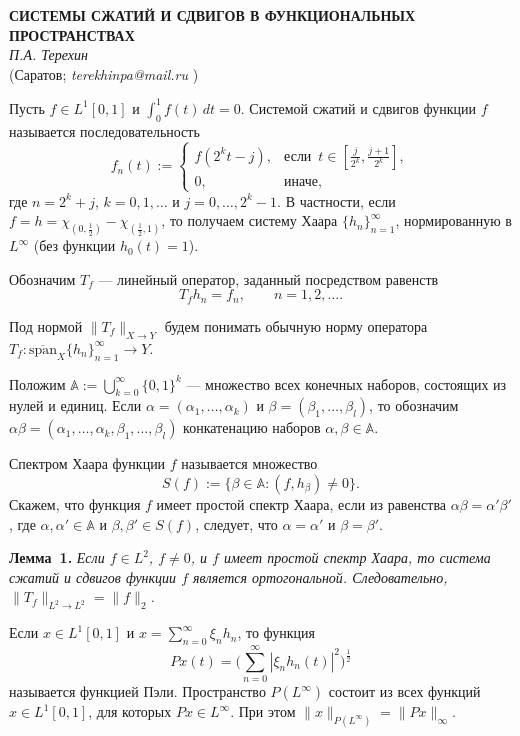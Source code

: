 \begin{center}{ \bf  СИСТЕМЫ СЖАТИЙ И СДВИГОВ В ФУНКЦИОНАЛЬНЫХ ПРОСТРАНСТВАХ}\\
{\it П.А. Терехин } \\
(Саратов; {\it terekhinpa@mail.ru} )
\end{center}

Пусть $f\in L^1[0,1]$ и $\int_0^1f(t)\,dt=0$. Системой сжатий и сдвигов функции $f$ называется последовательность
$$
f_n(t):=\begin{cases}
f(2^kt-j), & \text{если}\,\,\, t\in[\frac{j}{2^k},\frac{j+1}{2^k}], \\
0, & \text{иначе},
\end{cases}
$$
где $n=2^k+j$, $k=0,1,\ldots$ и $j=0,\ldots,2^k-1$. В частности, если $f=h=\chi_{(0,\frac12)}-\chi_{(\frac12,1)}$, то получаем
систему Хаара $\{h_n\}_{n=1}^{\infty}$, нормированную в $L^{\infty}$ (без функции $h_0(t)=1$).

Обозначим $T_f$ --- линейный оператор, заданный посредством равенств
$$
T_fh_n=f_n, \qquad n=1,2,\ldots.
$$

Под нормой $\|T_f\|_{X\to Y}$ будем понимать обычную норму оператора $T_f:\overline{\text{span}}_X\{h_n\}_{n=1}^{\infty}\to Y$.

Положим $\mathbb{A}:=\bigcup_{k=0}^{\infty}\{0,1\}^k$ --- множество всех конечных наборов, состоящих из нулей и единиц.
Если $\alpha=(\alpha_1,\ldots,\alpha_k)$ и $\beta=(\beta_1,\ldots,\beta_l)$, то обозначим
$\alpha\beta=(\alpha_1,\ldots,\alpha_k,\beta_1,\ldots,\beta_l)$ конкатенацию наборов $\alpha,\beta\in\mathbb{A}$.

Спектром Хаара функции $f$ называется множество
$$
S(f):=\{\beta\in\mathbb{A}:(f,h_{\beta})\neq0\}.
$$
Скажем, что функция $f$ имеет простой спектр Хаара, если из равенства $\alpha\beta=\alpha'\beta'$, где $\alpha,\alpha'\in\mathbb{A}$ и $\beta,\beta'\in S(f)$, следует, что $\alpha=\alpha'$ и $\beta=\beta'$.

\textbf{Лемма~1.} {\it Если $f\in L^2$, $f\neq0$, и $f$ имеет простой спектр Хаара, то система сжатий и сдвигов функции $f$ является ортогональной.
Следовательно, $\|T_f\|_{L^2\to L^2}=\|f\|_2$.}

Если $x\in L^1[0,1]$ и $x=\sum_{n=0}^{\infty}\xi_nh_n$, то функция
$$
Px(t)=\biggl(\sum_{n=0}^{\infty}|\xi_nh_n(t)|^2\biggr)^{\frac12}
$$
называется функцией Пэли. Пространство $P(L^{\infty})$ состоит из всех функций $x\in L^1[0,1]$, для которых $Px\in L^{\infty}$.
При этом $\|x\|_{P(L^{\infty})}=\|Px\|_{\infty}$.

